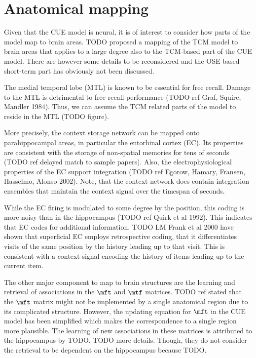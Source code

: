 \section{Anatomical mapping}

Given that the CUE model is neural, it is of interest to consider how parts of the model map to brain areas.
TODO proposed a mapping of the TCM model to brain areas that applies to a large degree also to the TCM-based part of the CUE model.
There are however some details to be reconsidered and the OSE-based short-term part has obviously not been discussed.

The medial temporal lobe (MTL) is known to be essential for free recall.
Damage to the MTL is detrimental to free recall performance (TODO ref Graf, Squire, Mandler 1984).
Thus, we can assume the TCM related parts of the model to reside in the MTL (TODO figure).

More precisely, the context storage network can be mapped  onto parahippocampal areas, in particular the entorhinal cortex (EC).
Its properties are consistent with the storage of non-spatial memories for tens of seconds (TODO ref delayed match to sample papers).
Also, the electrophysiological properties of the EC support integration (TODO ref Egorow, Hamary, Fransen, Hasselmo, Alonso 2002).
Note, that the context network does contain integration ensembles that maintain the context signal over the timespan of seconds.

While the EC firing is modulated to some degree by the position, this coding is more noisy than in the hippocampus (TODO ref Quirk et al 1992).
This indicates that EC codes for additional information.
TODO LM Frank et al 2000 have shown that superficial EC employs retrospective coding, that it differentiates visits of the same position by the history leading up to that visit.
This is consistent with a context signal encoding the history of items leading up to the current item.

The other major component to map to brain structures are the learning and retrieval of associations in the $\mft$ and $\mtf$ matrices.
TODO ref stated that the $\mft$ matrix might not be implemented by a single anatomical region due to its complicated structure.
However, the updating equation for $\mft$ in the CUE model has been simplified which makes the correspondence to a single region more plausible.
The learning of new associations in these matrices is attributed to the hippocampus by TODO\@.
TODO more details.
Though, they do not consider the retrieval to be dependent on the hippocampus because TODO\@.

